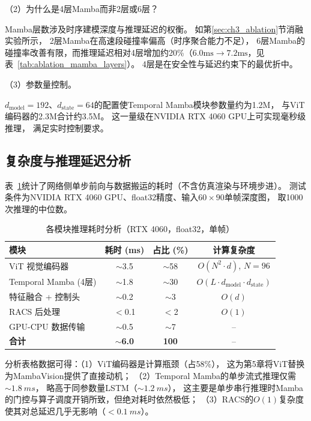 （2）为什么是4层Mamba而非2层或6层？

Mamba层数涉及时序建模深度与推理延迟的权衡。
如第\ref{sec:ch3_ablation}节消融实验所示，
2层Mamba在高速段碰撞率偏高（时序聚合能力不足），
6层Mamba的碰撞率改善有限，而推理延迟相对4层增加约20\%（$6.0\text{ms} \rightarrow 7.2\text{ms}$，见表~\ref{tab:ablation_mamba_layers}）。
4层是在安全性与延迟约束下的最优折中。

（3）参数量控制。

$d_{\text{model}} = 192$、$d_{\text{state}} = 64$的配置使Temporal Mamba模块参数量约为1.2M，
与ViT编码器的2.3M合计约3.5M。
这一量级在NVIDIA RTX 4060 GPU上可实现毫秒级推理，
满足实时控制要求。

\subsection{复杂度与推理延迟分析}

表~\ref{tab:latency_profile}统计了网络侧单步前向与数据搬运的耗时（不含仿真渲染与环境步进）。
测试条件为NVIDIA RTX 4060 GPU、float32精度、输入$60 \times 90$单帧深度图，
取1000次推理的中位数。

\begin{table}[htbp]
\centering
\caption{各模块推理耗时分析（RTX 4060，float32，单帧）}
\label{tab:latency_profile}
\begin{tabular}{lccc}
\toprule
\textbf{模块} & \textbf{耗时 (ms)} & \textbf{占比 (\%)} & \textbf{计算复杂度} \\
\midrule
ViT 视觉编码器 & $\sim$3.5 & $\sim$58 & $O(N^2 \cdot d)$, $N=96$ \\
Temporal Mamba (4层) & $\sim$1.8 & $\sim$30 & $O(L \cdot d_{\text{model}} \cdot d_{\text{state}})$ \\
特征融合 + 控制头 & $\sim$0.2 & $\sim$3 & $O(d)$ \\
RACS 后处理 & $<$0.1 & $<$2 & $O(1)$ \\
GPU-CPU 数据传输 & $\sim$0.5 & $\sim$7 & -- \\
\midrule
\textbf{合计} & $\sim$\textbf{6.0} & \textbf{100} & -- \\
\bottomrule
\end{tabular}
\end{table}

分析表格数据可得：（1）ViT编码器是计算瓶颈（占58\%），
这为第5章将ViT替换为MambaVision提供了直接动机；
（2）Temporal Mamba的单步流式推理仅需$\sim\SI{1.8}{ms}$，
略高于同参数量LSTM（$\sim\SI{1.2}{ms}$），
这主要是单步串行推理时Mamba的门控与算子调度开销所致，但绝对耗时依然极低；
（3）RACS的$O(1)$复杂度使其对总延迟几乎无影响（$<\SI{0.1}{ms}$）。

